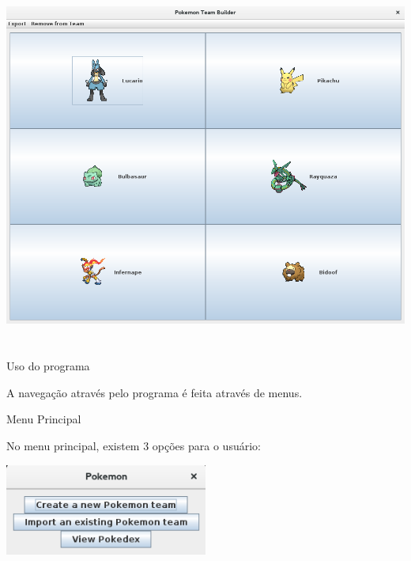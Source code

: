 \documentclass[
	article,			%
	12pt,				%
	oneside,			%
	a4paper,			%
	english,			%
	brazil,				%
	sumario=tradicional
	]{abntex2}
\begin{document}
\begin{center}
\includegraphics[width=1\textwidth]{team_full}\par\vspace{1cm}
\end{center}


\newpage
\section*{}

\begin{center}
{\HUGE Uso do programa}
\end{center}

A navegação através pelo programa é feita através de menus.

\begin{center}
{\Large Menu Principal}
\end{center}

No menu principal, existem 3 opções para o usuário:

\begin{center}
\includegraphics[width=0.5\textwidth]{menu}\par
\end{center}
\end{document}
